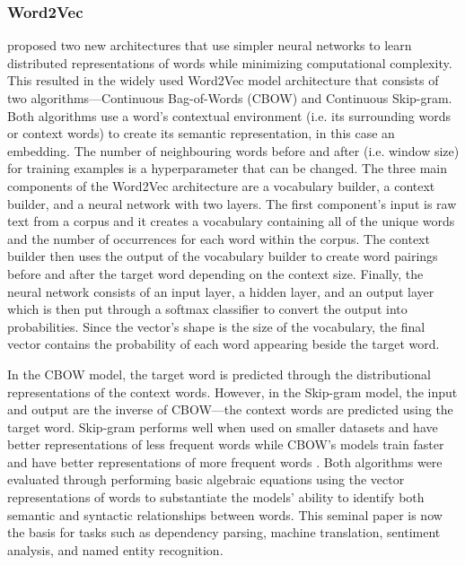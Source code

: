 
\subsubsection{Word2Vec}
\citet{mikolov2013efficient} proposed two new architectures that use simpler neural networks to learn distributed representations of words while minimizing computational complexity. This resulted in the widely used Word2Vec model architecture that consists of two algorithms—Continuous Bag-of-Words (CBOW) and Continuous Skip-gram. Both algorithms use a word’s contextual environment (i.e. its surrounding words or context words) to create its semantic representation, in this case an embedding. The number of neighbouring words before and after (i.e. window size) for training examples is a hyperparameter that can be changed. The three main components of the Word2Vec architecture are a vocabulary builder, a context builder, and a neural network with two layers. The first component’s input is raw text from a corpus and it creates a vocabulary containing all of the unique words and the number of occurrences for each word within the corpus. The context builder then uses the output of the vocabulary builder to create word pairings before and after the target word depending on the context size. Finally, the neural network consists of an input layer, a hidden layer, and an output layer which is then put through a softmax classifier to convert the output into probabilities. Since the vector’s shape is the size of the vocabulary, the final vector contains the probability of each word appearing beside the target word. 

In the CBOW model, the target word is predicted through the distributional representations of the context words. However, in the Skip-gram model, the input and output are the inverse of CBOW—the context words are predicted using the target word.  Skip-gram performs well when used on smaller datasets and have better representations of less frequent words while CBOW’s models train faster and have better representations of more frequent words \citep{mikolov2013efficient}. Both algorithms were evaluated through performing basic algebraic equations using the vector representations of words to substantiate the models’ ability to identify both semantic and syntactic relationships between words. This seminal paper is now the basis for tasks such as dependency parsing, machine translation, sentiment analysis, and named entity recognition.


